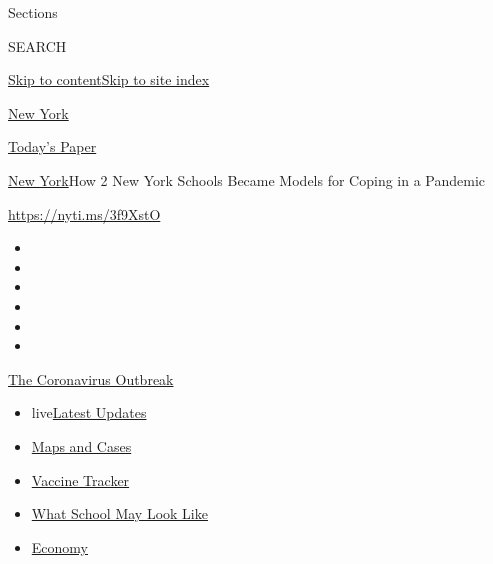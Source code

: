 Sections

SEARCH

\protect\hyperlink{site-content}{Skip to
content}\protect\hyperlink{site-index}{Skip to site index}

\href{https://www.nytimes.com/section/nyregion}{New York}

\href{https://myaccount.nytimes.com/auth/login?response_type=cookie\&client_id=vi}{}

\href{https://www.nytimes.com/section/todayspaper}{Today's Paper}

\href{/section/nyregion}{New York}\textbar{}How 2 New York Schools
Became Models for Coping in a Pandemic

\url{https://nyti.ms/3f9XstO}

\begin{itemize}
\item
\item
\item
\item
\item
\item
\end{itemize}

\href{https://www.nytimes.com/news-event/coronavirus?action=click\&pgtype=Article\&state=default\&region=TOP_BANNER\&context=storylines_menu}{The
Coronavirus Outbreak}

\begin{itemize}
\tightlist
\item
  live\href{https://www.nytimes.com/2020/08/01/world/coronavirus-covid-19.html?action=click\&pgtype=Article\&state=default\&region=TOP_BANNER\&context=storylines_menu}{Latest
  Updates}
\item
  \href{https://www.nytimes.com/interactive/2020/us/coronavirus-us-cases.html?action=click\&pgtype=Article\&state=default\&region=TOP_BANNER\&context=storylines_menu}{Maps
  and Cases}
\item
  \href{https://www.nytimes.com/interactive/2020/science/coronavirus-vaccine-tracker.html?action=click\&pgtype=Article\&state=default\&region=TOP_BANNER\&context=storylines_menu}{Vaccine
  Tracker}
\item
  \href{https://www.nytimes.com/interactive/2020/07/29/us/schools-reopening-coronavirus.html?action=click\&pgtype=Article\&state=default\&region=TOP_BANNER\&context=storylines_menu}{What
  School May Look Like}
\item
  \href{https://www.nytimes.com/live/2020/07/31/business/stock-market-today-coronavirus?action=click\&pgtype=Article\&state=default\&region=TOP_BANNER\&context=storylines_menu}{Economy}
\end{itemize}

